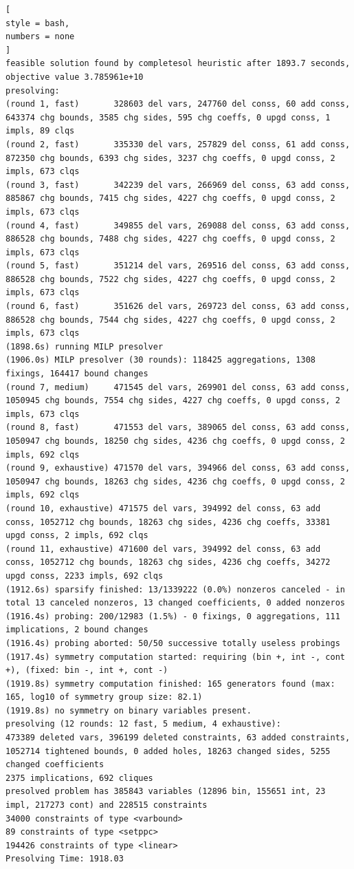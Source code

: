 \documentclass[%
	11pt,
	a4paper,
	utf8,
		]{article}
\begin{document}
\begin{lstlisting}[
style = bash,
numbers = none
]
feasible solution found by completesol heuristic after 1893.7 seconds, objective value 3.785961e+10
presolving:
(round 1, fast)       328603 del vars, 247760 del conss, 60 add conss, 643374 chg bounds, 3585 chg sides, 595 chg coeffs, 0 upgd conss, 1 impls, 89 clqs
(round 2, fast)       335330 del vars, 257829 del conss, 61 add conss, 872350 chg bounds, 6393 chg sides, 3237 chg coeffs, 0 upgd conss, 2 impls, 673 clqs
(round 3, fast)       342239 del vars, 266969 del conss, 63 add conss, 885867 chg bounds, 7415 chg sides, 4227 chg coeffs, 0 upgd conss, 2 impls, 673 clqs
(round 4, fast)       349855 del vars, 269088 del conss, 63 add conss, 886528 chg bounds, 7488 chg sides, 4227 chg coeffs, 0 upgd conss, 2 impls, 673 clqs
(round 5, fast)       351214 del vars, 269516 del conss, 63 add conss, 886528 chg bounds, 7522 chg sides, 4227 chg coeffs, 0 upgd conss, 2 impls, 673 clqs
(round 6, fast)       351626 del vars, 269723 del conss, 63 add conss, 886528 chg bounds, 7544 chg sides, 4227 chg coeffs, 0 upgd conss, 2 impls, 673 clqs
(1898.6s) running MILP presolver
(1906.0s) MILP presolver (30 rounds): 118425 aggregations, 1308 fixings, 164417 bound changes
(round 7, medium)     471545 del vars, 269901 del conss, 63 add conss, 1050945 chg bounds, 7554 chg sides, 4227 chg coeffs, 0 upgd conss, 2 impls, 673 clqs
(round 8, fast)       471553 del vars, 389065 del conss, 63 add conss, 1050947 chg bounds, 18250 chg sides, 4236 chg coeffs, 0 upgd conss, 2 impls, 692 clqs
(round 9, exhaustive) 471570 del vars, 394966 del conss, 63 add conss, 1050947 chg bounds, 18263 chg sides, 4236 chg coeffs, 0 upgd conss, 2 impls, 692 clqs
(round 10, exhaustive) 471575 del vars, 394992 del conss, 63 add conss, 1052712 chg bounds, 18263 chg sides, 4236 chg coeffs, 33381 upgd conss, 2 impls, 692 clqs
(round 11, exhaustive) 471600 del vars, 394992 del conss, 63 add conss, 1052712 chg bounds, 18263 chg sides, 4236 chg coeffs, 34272 upgd conss, 2233 impls, 692 clqs
(1912.6s) sparsify finished: 13/1339222 (0.0%) nonzeros canceled - in total 13 canceled nonzeros, 13 changed coefficients, 0 added nonzeros
(1916.4s) probing: 200/12983 (1.5%) - 0 fixings, 0 aggregations, 111 implications, 2 bound changes
(1916.4s) probing aborted: 50/50 successive totally useless probings
(1917.4s) symmetry computation started: requiring (bin +, int -, cont +), (fixed: bin -, int +, cont -)
(1919.8s) symmetry computation finished: 165 generators found (max: 165, log10 of symmetry group size: 82.1)
(1919.8s) no symmetry on binary variables present.
presolving (12 rounds: 12 fast, 5 medium, 4 exhaustive):
473389 deleted vars, 396199 deleted constraints, 63 added constraints, 1052714 tightened bounds, 0 added holes, 18263 changed sides, 5255 changed coefficients
2375 implications, 692 cliques
presolved problem has 385843 variables (12896 bin, 155651 int, 23 impl, 217273 cont) and 228515 constraints
34000 constraints of type <varbound>
89 constraints of type <setppc>
194426 constraints of type <linear>
Presolving Time: 1918.03


\end{lstlisting}
\end{document}
